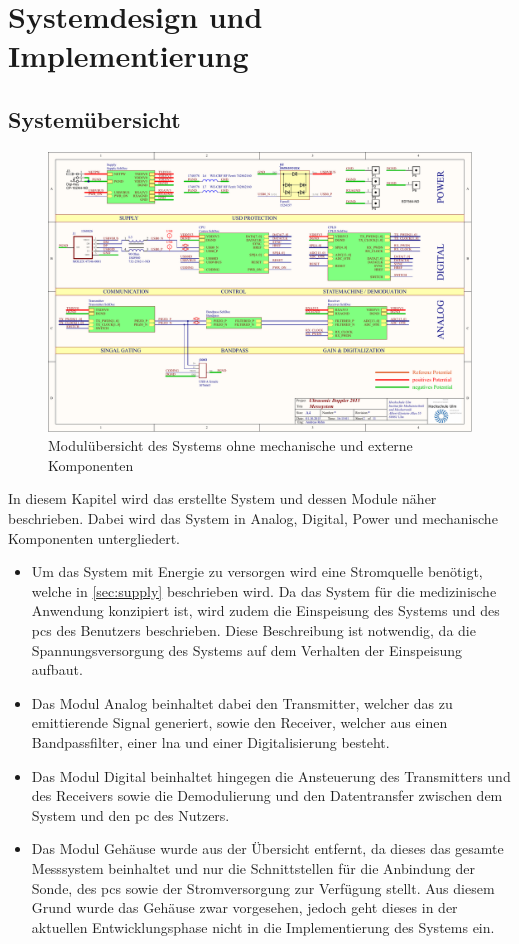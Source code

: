 \chapter{Systemdesign und Implementierung}
\section{Systemübersicht}
\begin{figure}[!h]
	\centering
   	\includegraphics[page=1,width=1.0\textwidth, trim= 5mm 5mm 5mm 5mm, clip=true]{images/pcb/new.PDF}%
    \caption{Modulübersicht des Systems ohne mechanische und externe Komponenten}
    \label{fig:system}
\end{figure}
In diesem Kapitel wird das erstellte System und dessen Module näher beschrieben. Dabei wird das System in Analog, Digital, Power und mechanische Komponenten untergliedert.
\begin{itemize}
\item Um das System mit Energie zu versorgen wird eine Stromquelle benötigt, welche in \autoref{sec:supply} beschrieben wird. Da das System für die medizinische Anwendung konzipiert ist, wird zudem die Einspeisung des Systems und des \ac{pc}s des Benutzers beschrieben. Diese Beschreibung ist notwendig, da die Spannungsversorgung des Systems auf dem Verhalten der Einspeisung aufbaut.
\item Das Modul Analog beinhaltet dabei den Transmitter, welcher das zu emittierende Signal generiert, sowie den Receiver, welcher aus einen Bandpassfilter, einer \ac{lna} und einer Digitalisierung besteht.
\item Das Modul Digital beinhaltet hingegen die Ansteuerung des Transmitters und des Receivers sowie die Demodulierung und den Datentransfer zwischen dem System und den \ac{pc} des Nutzers.
\item Das Modul Gehäuse wurde aus der Übersicht entfernt, da dieses das gesamte Messsystem beinhaltet und nur die Schnittstellen für die Anbindung der Sonde, des \ac{pc}s sowie der Stromversorgung zur Verfügung stellt. Aus diesem Grund wurde das Gehäuse zwar vorgesehen, jedoch geht dieses in der aktuellen Entwicklungsphase nicht in die Implementierung des Systems ein.
\end{itemize}

